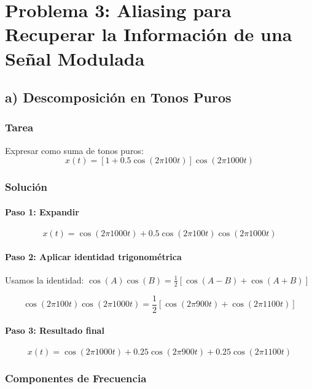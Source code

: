 \documentclass[12pt]{article}
\begin{document}
\section{Problema 3: Aliasing para Recuperar la Información de una Señal Modulada}

\subsection*{a) Descomposición en Tonos Puros}

\subsubsection*{Tarea}
Expresar como suma de tonos puros:
\begin{equation}
x(t) = \left[1 + 0.5\cos(2\pi 100t)\right] \cos(2\pi 1000t)
\end{equation}

\subsubsection*{Solución}

\paragraph*{Paso 1: Expandir}
\begin{equation}
x(t) = \cos(2\pi 1000t) + 0.5\cos(2\pi 100t)\cos(2\pi 1000t)
\end{equation}

\paragraph*{Paso 2: Aplicar identidad trigonométrica}
Usamos la identidad: $\cos(A)\cos(B) = \frac{1}{2}[\cos(A-B) + \cos(A+B)]$

\begin{equation}
\cos(2\pi 100t)\cos(2\pi 1000t) = \frac{1}{2}[\cos(2\pi 900t) + \cos(2\pi 1100t)]
\end{equation}

\paragraph*{Paso 3: Resultado final}
\begin{equation}
\boxed{x(t) = \cos(2\pi 1000t) + 0.25\cos(2\pi 900t) + 0.25\cos(2\pi 1100t)}
\end{equation}

\subsubsection*{Componentes de Frecuencia}
\end{document}
